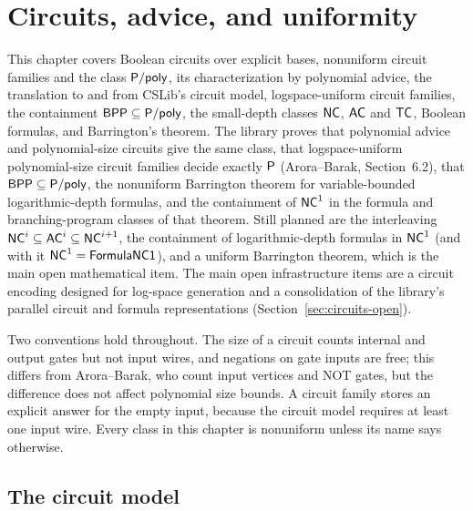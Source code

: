 \chapter{Circuits, advice, and uniformity}
\label{chap:circuits}

This chapter covers Boolean circuits over explicit bases, nonuniform circuit
families and the class $\mathsf{P/poly}$, its characterization by polynomial
advice, the translation to and from CSLib's circuit model, logspace-uniform
circuit families, the containment $\mathsf{BPP} \subseteq \mathsf{P/poly}$, the
small-depth classes $\mathsf{NC}$, $\mathsf{AC}$ and $\mathsf{TC}$, Boolean formulas, and
Barrington's theorem. The library proves that polynomial advice and
polynomial-size circuits give the same class, that logspace-uniform
polynomial-size circuit families decide exactly $\mathsf{P}$ (Arora--Barak,
Section~6.2), that $\mathsf{BPP} \subseteq \mathsf{P/poly}$, the nonuniform Barrington
theorem for variable-bounded logarithmic-depth formulas, and the containment of
$\mathsf{NC}^1$ in the formula and branching-program classes of that theorem. Still
planned are the interleaving $\mathsf{NC}^i \subseteq \mathsf{AC}^i \subseteq
\mathsf{NC}^{i+1}$, the containment of logarithmic-depth formulas in $\mathsf{NC}^1$
(and with it $\mathsf{NC}^1 = \mathsf{FormulaNC1}$), and a uniform Barrington theorem,
which is the main open mathematical item. The main open infrastructure items
are a circuit encoding designed for log-space generation and a consolidation of
the library's parallel circuit and formula representations
(Section~\ref{sec:circuits-open}).

Two conventions hold throughout. The size of a circuit counts internal and
output gates but not input wires, and negations on gate inputs are free; this
differs from Arora--Barak, who count input vertices and NOT gates, but the
difference does not affect polynomial size bounds. A circuit family stores an
explicit answer for the empty input, because the circuit model requires at
least one input wire. Every class in this chapter is nonuniform unless its name
says otherwise.

\section{The circuit model}
\label{sec:circuits-model}

